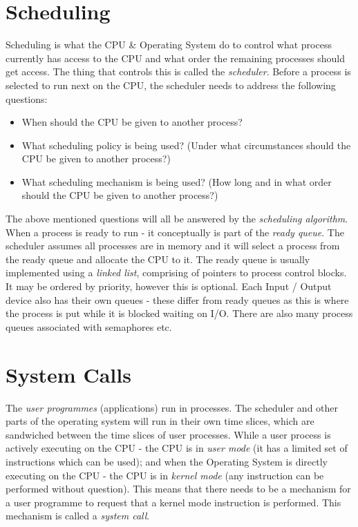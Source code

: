 \section{Scheduling}
Scheduling is what the CPU \& Operating System do to control what process currently has access to the CPU and what order the remaining processes should get access. The thing that controls this is called the \textit{scheduler}. Before a process is selected to run next on the CPU, the scheduler needs to address the following questions:
\begin{itemize}
    \item When should the CPU be given to another process?
    \item What scheduling policy is being used? (Under what circumstances should the CPU be given to another process?)
    \item What scheduling mechanism is being used? (How long and in what order should the CPU be given to another process?)
\end{itemize}
The above mentioned questions will all be answered by the \textit{scheduling algorithm}.\\

When a process is ready to run - it conceptually is part of the \textit{ready queue}. The scheduler assumes all processes are in memory and it will select a process from the ready queue and allocate the CPU to it. The ready queue is usually implemented using a \textit{linked list}, comprising of pointers to process control blocks. It may be ordered by priority, however this is optional. Each Input / Output device also has their own queues - these differ from ready queues as this is where the process is put while it is blocked waiting on I/O. There are also many process queues associated with semaphores etc.

\section{System Calls}
The \textit{user programmes} (applications) run in processes. The scheduler and other parts of the operating system will run in their own time slices, which are sandwiched between the time slices of user processes. While a user process is actively executing on the CPU - the CPU is in \textit{user mode} (it has a limited set of instructions which can be used); and when the Operating System is directly executing on the CPU - the CPU is in \textit{kernel mode} (any instruction can be performed without question). This means that there needs to be a mechanism for a user programme to request that a kernel mode instruction is performed. This mechanism is called a \textit{system call}.\\

